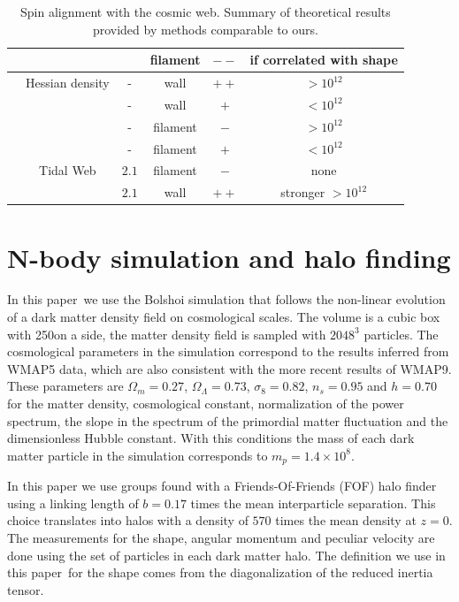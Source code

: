 \documentclass[usenatbib]{mn2e}
\newcommand{\documentname}{paper~}
\newcommand{\hMpc}{{\ifmmode{h^{-1}{\rm Mpc}}\else{$h^{-1}$Mpc }\fi}}
\newcommand{\hMsun}{{\ifmmode{h^{-1}{\rm
        {M_{\odot}}}}\else{$h^{-1}{\rm{M_{\odot}}}$}\fi}}
\begin{document}
\begin{table}
\begin{tabular}{cccccc}
& &  & 
filament & $--$ & if correlated with shape\\\hline

\cite{AragonCalvo2007} & Hessian density & - &
wall & $++$ & $>10^{12}$\hMsun\\


& & - &
wall & $+$ & $<10^{12}$\hMsun\\

& & - &
filament& $-$ & $>10^{12}$\hMsun\\\hline


& & - &
filament& $+$ & $<10^{12}$\hMsun\\\hline



\cite{Hahn2007} & Tidal Web & $2.1$ & filament & $-$& none\\


& &  $2.1$\hMpc &
wall & $++$ & stronger $>10^{12}$\\\hline \hline

\end{tabular}
\caption{Spin alignment with the cosmic web. Summary of theoretical
  results provided by methods comparable to ours.}

\end{table}



\section{N-body simulation and halo finding}
\label{sec:nbody}

In this \documentname we use the Bolshoi simulation that follows the
non-linear evolution of a dark matter density field on cosmological
scales. The volume is a cubic box with 250\hMpc on a side, the matter
density field is sampled with $2048^3$ particles. The  
cosmological parameters in the simulation correspond to the results
inferred from WMAP5 data, which are also consistent with the more
recent results of WMAP9. These parameters are $\Omega_m=0.27$,
$\Omega_{\Lambda} =0.73$, $\sigma_8=0.82$, $n_s=0.95$ and $h=0.70$ for the
matter density, cosmological constant, normalization of the power
spectrum, the slope in the spectrum of the primordial matter
fluctuation and the dimensionless Hubble constant. With this
conditions the mass of each dark matter particle in the simulation
corresponds to $m_p=1.4\times 10^{8}$\hMsun. 


In this paper we use groups found with a Friends-Of-Friends (FOF) halo
finder using a linking length of $b=0.17$ times the mean interparticle
separation. This choice translates into halos with a density of $570$
times the mean density at $z=0$. The measurements for the shape,
angular momentum and peculiar velocity are done using the set of
particles in each dark matter halo. The definition we use in this
\documentname for the shape comes from the diagonalization of the
reduced inertia tensor.
\end{document}
